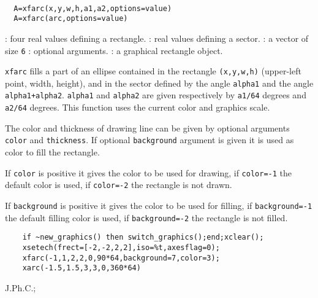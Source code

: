 \begin{mandesc}
  \\ %
\end{mandesc}
\begin{calling_sequence}
\begin{verbatim}
  A=xfarc(x,y,w,h,a1,a2,options=value)
  A=xfarc(arc,options=value)
\end{verbatim}
\end{calling_sequence}
\begin{parameters}
  \begin{varlist}
    : four real values defining a rectangle.
    : real values defining a sector.
    : a vector of size \verb!6! 
    : optional arguments.
    : a graphical rectangle object.
  \end{varlist}
\end{parameters}

\begin{mandescription}
  \verb!xfarc! fills a part of an ellipse contained in the rectangle 
  \verb!(x,y,w,h)!
  (upper-left point, width, height), and in the sector defined by 
  the angle \verb!alpha1! and the angle \verb!alpha1+alpha2!. 
  \verb!alpha1! and \verb!alpha2! are 
  given respectively by \verb!a1/64! degrees and \verb!a2/64! degrees.
  This function uses the current color and graphics scale.

  The color and thickness of drawing line can be given by optional arguments
  \verb!color! and \verb!thickness!. If optional \verb!background!
  argument is given it is used as color to fill the rectangle.

  If \verb!color! is positive it gives the color to be used for drawing,
  if \verb!color=-1! the default color is used, if  \verb!color=-2! the
  rectangle is not drawn.

  If \verb!background! is positive it gives the color to be used for filling,
  if \verb!background=-1! the default filling color is used,
  if  \verb!background=-2! the rectangle is not filled.
  
\end{mandescription}

\begin{examples}
  \begin{Verbatim}
    if ~new_graphics() then switch_graphics();end;xclear();
    xsetech(frect=[-2,-2,2,2],iso=%t,axesflag=0);
    xfarc(-1,1,2,2,0,90*64,background=7,color=3);
    xarc(-1.5,1.5,3,3,0,360*64)
  \end{Verbatim}
\end{examples}

\begin{manseealso}
     
\end{manseealso}


\begin{authors}
  J.Ph.C.;   

\end{authors}

